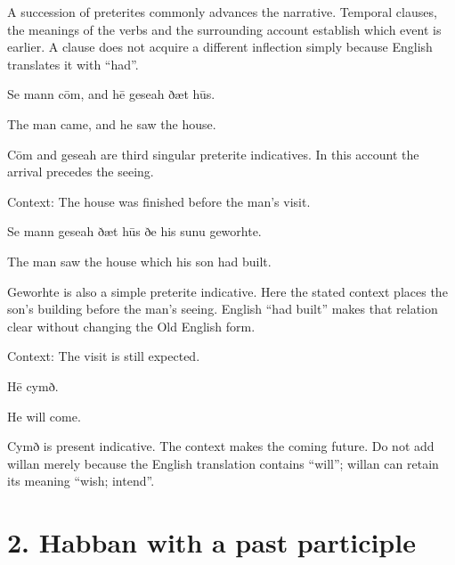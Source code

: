 A succession of preterites commonly advances the narrative. Temporal clauses, the meanings of the verbs and the surrounding account establish which event is earlier. A clause does not acquire a different inflection simply because English translates it with “had”.

Se mann cōm, and hē geseah ðæt hūs.

The man came, and he saw the house.

Cōm and geseah are third singular preterite indicatives. In this account the arrival precedes the seeing.

Context: The house was finished before the man’s visit.

Se mann geseah ðæt hūs ðe his sunu geworhte.

The man saw the house which his son had built.

Geworhte is also a simple preterite indicative. Here the stated context places the son’s building before the man’s seeing. English “had built” makes that relation clear without changing the Old English form.

Context: The visit is still expected.

Hē cymð.

He will come.

Cymð is present indicative. The context makes the coming future. Do not add willan merely because the English translation contains “will”; willan can retain its meaning “wish; intend”.

\section*{2. Habban with a past participle}

